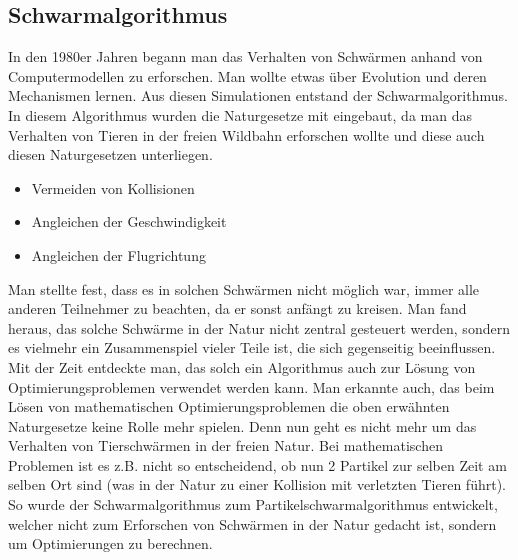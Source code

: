 \subsection{Schwarmalgorithmus}

In den 1980er Jahren begann man das Verhalten von Schwärmen anhand von Computermodellen zu erforschen. Man wollte etwas über Evolution und deren Mechanismen lernen. Aus diesen Simulationen entstand der Schwarmalgorithmus.
In diesem Algorithmus wurden die Naturgesetze mit eingebaut, da man das Verhalten von Tieren in der freien Wildbahn erforschen wollte und diese auch diesen Naturgesetzen unterliegen.

\begin{itemize}
\item Vermeiden von Kollisionen 
\item Angleichen der Geschwindigkeit
\item Angleichen der Flugrichtung
\end{itemize}

Man stellte fest, dass es in solchen Schwärmen nicht möglich war, immer alle anderen Teilnehmer zu beachten, da er sonst anfängt zu kreisen. Man fand heraus, das solche Schwärme in der Natur nicht zentral gesteuert werden, sondern es vielmehr ein Zusammenspiel vieler Teile ist, die sich gegenseitig beeinflussen.\\
Mit der Zeit entdeckte man, das solch ein Algorithmus auch zur Lösung von Optimierungsproblemen verwendet werden kann.
Man erkannte auch, das beim Lösen von mathematischen Optimierungsproblemen die oben erwähnten Naturgesetze keine Rolle mehr spielen. Denn nun geht es nicht mehr um das Verhalten von Tierschwärmen in der freien Natur. Bei mathematischen Problemen ist es z.B. nicht so entscheidend, ob nun 2 Partikel zur selben Zeit am selben Ort sind (was in der Natur zu einer Kollision mit verletzten Tieren führt). So wurde der Schwarmalgorithmus zum Partikelschwarmalgorithmus entwickelt, welcher nicht zum Erforschen von Schwärmen in der Natur gedacht ist, sondern um Optimierungen zu berechnen.